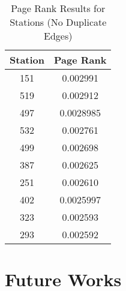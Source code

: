 \documentclass{article}
\begin{document}
 \begin{table}[h!]
\caption{Page Rank Results for Stations (No Duplicate Edges)}
\centering
 \begin{tabular}{||c c||} 
 \hline
 Station & Page Rank \\ [0.5ex] 
 \hline\hline
 151 & 0.002991\\ 
 519 & 0.002912\\
 497 & 0.0028985\\ 
 532 & 0.002761\\
 499 & 0.002698\\
 387 & 0.002625\\
 251 & 0.002610\\
 402 & 0.0025997\\
 323 & 0.002593\\
 293 & 0.002592\\[1ex] 
 \hline
 \end{tabular}
 \end{table}

\section{Future Works}
\end{document}
